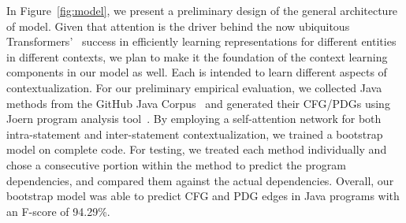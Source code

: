 

In Figure~\ref{fig:model}, we present a preliminary design of the general architecture of \tool model. Given that attention is the driver behind the now ubiquitous Transformers’~\cite{Vaswani-2017} success in efficiently learning representations for different entities in different contexts, we plan to make it the foundation of the context learning components in our model as well. Each is intended to learn different aspects of contextualization. For our preliminary empirical evaluation, we collected Java methods from the GitHub Java Corpus~\cite{githubCorpus2013} and generated their CFG/PDGs using Joern program analysis tool~\cite{joern-2014}. By employing a self-attention network for both intra-statement and inter-statement contextualization, we trained a bootstrap model on complete code. For testing, we treated each method individually and chose a consecutive portion within the method to predict the program dependencies, and compared them against the actual dependencies. Overall, our bootstrap model was able to predict CFG and PDG edges in Java programs with an F-score of 94.29\%.

